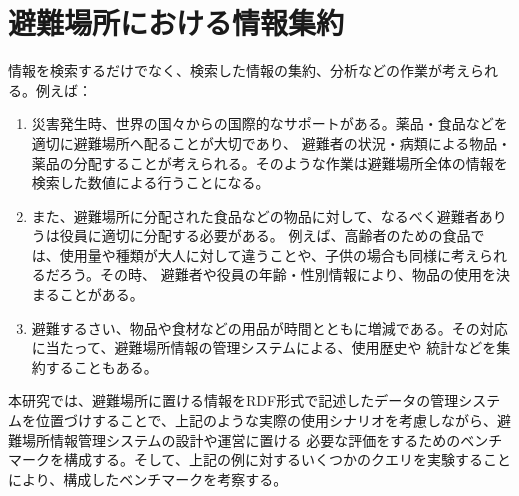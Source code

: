 \section{避難場所における情報集約}

情報を検索するだけでなく、検索した情報の集約、分析などの作業が考えられる。例えば：

\begin{enumerate}
	\item
	災害発生時、世界の国々からの国際的なサポートがある。薬品・食品などを適切に避難場所へ配ることが大切であり、
	避難者の状況・病類による物品・薬品の分配することが考えられる。そのような作業は避難場所全体の情報を検索した数値による行うことになる。
	\item また、避難場所に分配された食品などの物品に対して、なるべく避難者ありうは役員に適切に分配する必要がある。
	例えば、高齢者のための食品では、使用量や種類が大人に対して違うことや、子供の場合も同様に考えられるだろう。その時、
	避難者や役員の年齢・性別情報により、物品の使用を決まることがある。
	\item 避難するさい、物品や食材などの用品が時間とともに増減である。その対応に当たって、避難場所情報の管理システムによる、使用歴史や
	統計などを集約することもある。
\end{enumerate}

本研究では、避難場所に置ける情報をRDF形式で記述したデータの管理システムを位置づけすることで、上記のような実際の使用シナリオを考慮しながら、避難場所情報管理システムの設計や運営に置ける
必要な評価をするためのベンチマークを構成する。そして、上記の例に対するいくつかのクエリを実験することにより、構成したベンチマークを考察する。

